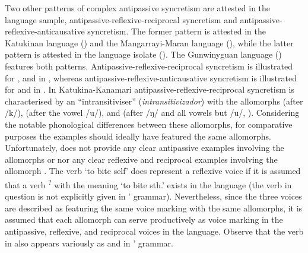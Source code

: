 Two other patterns of complex antipassive syncretism are attested in the language sample, anti\-pas\-sive-re\-flex\-ive-re\-ci\-pro\-cal syncretism and anti\-pas\-sive-re\-flex\-ive-anti\-cau\-sa\-tive syncretism. The former pattern is attested in the Katukinan language  () and the Mangarrayi-Maran language  (), while the latter pattern is attested in the language isolate  (). The Gunwinyguan language  () features both patterns. Anti\-pas\-sive-reflexive-reciprocal syncretism is illustrated for ,  and  in , whereas antipassive-reflexive-anticaus\-a\-tive syncretism is illustrated for  and  in . In Ka\-tu\-ki\-na-Ka\-na\-ma\-ri antipassive-reflexive-reciprocal syncretism is characterised by an “intransitiviser” (\textit{intransitivizador}) with the allomorphs  (after /k/),  (after the vowel /u/), and  (after /ŋ/ and all vowels but /u/, \citealt[121ff.]{dos-anjos:2011}). Considering the notable phonological differences between these allomorphs, for comparative purposes the examples should ideally have featured the same allomorphs. Unfortunately, \citeauthor{dos-anjos:2011} does not provide any clear antipassive examples involving the allomorphs  or  nor any clear reflexive and reciprocal examples involving the allomorph . The verb  ‘to bite self’ \citep[122]{dos-anjos:2011} does represent a reflexive voice if it is assumed that a verb \textsuperscript{?} with the meaning ‘to bite sth.’ exists in the language (the verb in question is not explicitly given in \citeauthor{dos-anjos:2011}’ grammar). Nevertheless, since the three voices are described as featuring the same voice marking with the same allomorphs, it is assumed that each allomorph can serve productively as voice marking in the antipassive, reflexive, and reciprocal voices in the language. Observe that the verb  in  also appears variously as  and  in \citeauthor{dos-anjos:2011}’ grammar.

